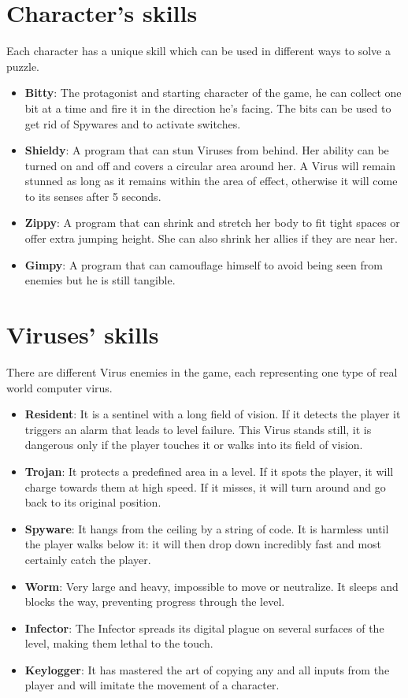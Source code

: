 \documentclass[12pt, a4paper]{report}
\begin{document}
\section*{Character’s skills}
Each character has a unique skill which can be used in different ways to solve a puzzle.
\begin{itemize}
	\item \textbf{Bitty}: The protagonist and starting character of the game, he can collect one bit at a time and fire it in the direction he’s facing. The bits can be used to get rid of Spywares and to activate switches.
	\item \textbf{Shieldy}: A program that can stun Viruses from behind. Her ability can be turned on and off and covers a circular area around her. A Virus will remain stunned as long as it remains within the area of effect, otherwise it will come to its senses after 5 seconds.
	\item \textbf{Zippy}: A program that can shrink and stretch her body to fit tight spaces or offer extra jumping height. She can also shrink her allies if they are near her.
	\item \textbf{Gimpy}: A program that can camouflage himself to avoid being seen from enemies but he is still tangible.
\end{itemize}

\section*{Viruses’ skills}
There are different Virus enemies in the game, each representing one type of real world computer virus.
\begin{itemize}
	\item \textbf{Resident}: It is a sentinel with a long field of vision. If it detects the player it triggers an alarm that leads to level failure. This Virus stands still, it is dangerous only if the player touches it or walks into its field of vision.
	\item \textbf{Trojan}: It protects a predefined area in a level. If it spots the player, it will charge towards them at high speed. If it misses, it will turn around and go back to its original position.
	\item \textbf{Spyware}: It hangs from the ceiling by a string of code. It is harmless until the player walks below it: it will then drop down incredibly fast and most certainly catch the player.
	\item \textbf{Worm}: Very large and heavy, impossible to move or neutralize. It sleeps and blocks the way, preventing progress through the level.
	\item \textbf{Infector}: The Infector spreads its digital plague on several surfaces of the level, making them lethal to the touch.
	\item \textbf{Keylogger}: It has mastered the art of copying any and all inputs from the player and will imitate the movement of a character.
\end{itemize}
\end{document}
